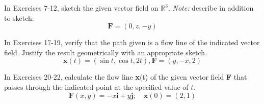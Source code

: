 \documentclass[12pt,letterpaper]{hmcpset}
\begin{document}
\begin{problem}[3.3.9]
    In Exercises 7-12, sketch the given vector field on $\mathbb{R}^3$.
    \textit{Note:} describe in addition to sketch.
    \[
        \textbf{F}=(0,z,-y)
    \]
\end{problem}
\begin{solution}
    \vfill
\end{solution}
\newpage

\begin{problem}[3.3.18]
    In Exercises 17-19, verify that the path given is a flow line of
    the indicated vector field. Justify the result geometrically with
    an appropriate sketch.
    \[
        \textbf{x}(t)=(\sin t,\cos t,2t),\textbf{F}=(y,-x,2)
    \]
\end{problem}
\begin{solution}
    \vfill
\end{solution}
\newpage


\begin{problem}[3.3.20]
    In Exercises 20-22, calculate the flow line \textbf{x}(t) of the
    given vector field \textbf{F} that passes through the indicated
    point at the specified value of $t$.
    \[
        \textbf{F}(x,y)=-x\textbf{i}+y\textbf{j};\quad\textbf{x}(0)=(2,1)
    \]
\end{problem}
\begin{solution}
    \vfill
\end{solution}
\end{document}
